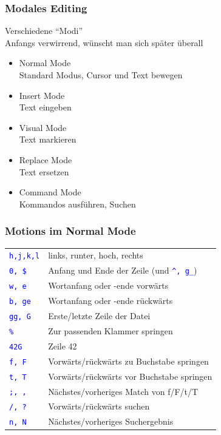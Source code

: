 \documentclass{beamer}
\newcommand{\cmd}[1]{\textcolor{blue}{\texttt{#1}}}
\begin{document}
\begin{frame}
  \frametitle{Modales Editing}
  Verschiedene \enquote{Modi} \\
  Anfangs verwirrend, wünscht man sich später überall \\[0.3cm]

  \begin{itemize}
    \item Normal Mode \\
      Standard Modus, Cursor und Text bewegen\\[0.3cm]
    \item Insert Mode \\
      Text eingeben \\[0.3cm]
    \item Visual Mode \\
      Text markieren \\[0.3cm]
    \item Replace Mode \\
      Text ersetzen \\[0.3cm]
    \item Command Mode \\
      Kommandos ausführen, Suchen
  \end{itemize}
\end{frame}

\begin{frame}
  \frametitle{Motions im Normal Mode}
  \begin{tabular}{l | l}
    \cmd{h,j,k,l} & links, runter, hoch, rechts \\[0.2cm]
    \cmd{0, \$} & Anfang und Ende der Zeile (und \cmd{\^{}, g\_}) \\[0.2cm]
    \cmd{w, e} & Wortanfang oder -ende vorwärts \\[0.2cm]
    \cmd{b, ge} & Wortanfang oder -ende rückwärts \\[0.2cm]
    \cmd{gg, G} & Erste/letzte Zeile der Datei \\[0.2cm]
    \cmd{\%} & Zur passenden Klammer springen \\[0.2cm]
    \cmd{42G} & Zeile 42 \\[0.2cm]
    \cmd{f, F} & Vorwärts/rückwärts zu Buchstabe springen \\[0.2cm]
    \cmd{t, T} & Vorwärts/rückwärts vor Buchstabe springen \\[0.2cm]
    \cmd{;, ,} & Nächstes/vorheriges Match von f/F/t/T \\[0.2cm]
    \cmd{/, ?} & Vorwärts/rückwärts suchen \\[0.2cm]
    \cmd{n, N} & Nächstes/vorheriges Suchergebnis
  \end{tabular}
\end{frame}
\end{document}
